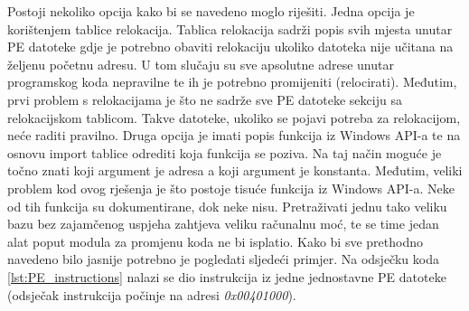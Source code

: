 \documentclass[times, utf8, diplomski, numeric]{fer}
\begin{document}
Postoji nekoliko opcija kako bi se navedeno moglo riješiti. Jedna opcija je korištenjem tablice relokacija. Tablica relokacija sadrži popis svih mjesta unutar PE datoteke gdje je potrebno obaviti relokaciju ukoliko datoteka nije učitana na željenu početnu adresu. U tom slučaju su sve apsolutne adrese unutar programskog koda nepravilne te ih je potrebno promijeniti (relocirati). Međutim, prvi problem s relokacijama je što ne sadrže sve PE datoteke sekciju sa relokacijskom tablicom. Takve datoteke, ukoliko se pojavi potreba za relokacijom, neće raditi pravilno. Druga opcija je imati popis funkcija iz Windows API-a te na osnovu import tablice odrediti koja funkcija se poziva. Na taj način moguće je točno znati koji argument je adresa a koji argument je konstanta. Međutim, veliki problem kod ovog rješenja je što postoje tisuće funkcija iz Windows API-a. Neke od tih funkcija su dokumentirane, dok neke nisu. Pretraživati jednu tako veliku bazu bez zajamčenog uspjeha zahtjeva veliku računalnu moć, te se time jedan alat poput modula za promjenu koda ne bi isplatio. Kako bi sve prethodno navedeno bilo jasnije potrebno je pogledati sljedeći primjer. Na odsječku koda \ref{lst:PE_instructions} nalazi se dio instrukcija iz jedne jednostavne PE datoteke (odsječak instrukcija počinje na adresi \emph{0x00401000}).
\end{document}
